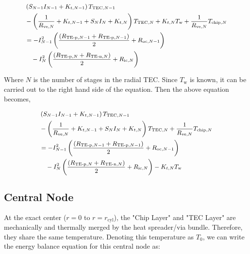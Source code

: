 \documentclass[10pt,a4paper,twocolumn]{article}
\begin{document}
\begin{equation*}
	\small
	\begin{aligned}
		 & \left(S_{N-1}I_{N-1}+K_{t,N-1}\right)T_{\text{TEC},N-1}                                          \\ &-\left(\frac{1}{R_{\text{ve},N}}+K_{t,N-1}+S_{N}I_{N}+K_{t,N} \right)T_{\text{TEC},N} +K_{t,N}T_{\text{w}}
		+\frac{1}{R_{\text{ve},N}}T_{\text{chip},N}                                                         \\ &=-I_{N-1}^2 \left( \frac{(R_{\text{TE-p},N-1}+R_{\text{TE-p},N-1})}{2} + R_{\text{oc},N-1} \right) \\
		 & \quad - I_{N}^2 \left( \frac{(R_{\text{TE-p},N}+R_{\text{TE-n},N})}{2} + R_{\text{ic},N} \right)
	\end{aligned}
\end{equation*}

Where $N$ is the number of stages in the radial TEC. Since $T_{\text{w}}$ is known, it can be carried out to the right hand side of the equation. Then the above equation becomes,

\begin{equation}
	\small
	\begin{aligned}
		 & \left(S_{N-1}I_{N-1}+K_{t,N-1}\right)T_{\text{TEC},N-1}                                                                 \\ &-\left(\frac{1}{R_{\text{ve},N}}+K_{t,N-1}+S_{N}I_{N}+K_{t,N} \right)T_{\text{TEC},N} +\frac{1}{R_{\text{ve},N}}T_{\text{chip},N}                                                                                                     \\ &=-I_{N-1}^2 \left( \frac{(R_{\text{TE-p},N-1}+R_{\text{TE-p},N-1})}{2} + R_{\text{oc},N-1} \right) \\
		 & \quad - I_{N}^2 \left( \frac{(R_{\text{TE-p},N}+R_{\text{TE-n},N})}{2} + R_{\text{ic},N} \right) - K_{t,N} T_{\text{w}}
	\end{aligned}
\end{equation}

\subsection{Central Node}

At the exact center ($r=0$ to $r=r_{\text{cyl}}$), the "Chip Layer" and "TEC Layer" are mechanically and thermally merged by the heat spreader/via bundle. Therefore, they share the same temperature. Denoting this temperature as $T_{0}$, we can write the energy balance equation for this central node as:
\end{document}
